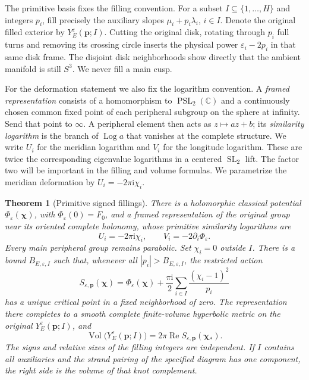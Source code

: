 \documentclass[11pt]{article}
\numberwithin{equation}{section}
\newtheorem{theorem}{Theorem}[section]
\theoremstyle{definition}\newtheorem{definition}[theorem]{Definition}
\theoremstyle{remark}\newtheorem{remark}[theorem]{Remark}
\newcommand{\ii}{\mathrm i}
\newcommand{\Vol}{\operatorname{Vol}}
\newcommand{\Rea}{\operatorname{Re}}
\newcommand{\Log}{\operatorname{Log}}
\newcommand{\eps}{\varepsilon}
\begin{document}
The primitive basis fixes the filling convention. For a subset
$I\subseteq\{1,\ldots,H\}$ and integers $p_i$, fill precisely the
auxiliary slopes $\mu_i+p_i\lambda_i$, $i\in I$. Denote the original
filled exterior by $Y_E^\eps(\mathbf p;I)$. Cutting the original disk,
rotating through $p_i$ full turns and removing its crossing circle
inserts the physical power $\eps_i-2p_i$ in that same disk frame.
The disjoint disk neighborhoods show directly that the ambient manifold
is still $S^3$. We never fill a main cusp.

For the deformation statement we also fix the logarithm convention.
A \emph{framed representation} consists of a homomorphism to
$\operatorname{PSL}_2(\mathbb C)$ and a continuously chosen common
fixed point of each peripheral subgroup on the sphere at infinity.
Send that point to $\infty$. A peripheral element then acts as
$z\mapsto a z+b$; its \emph{similarity logarithm} is the branch of
$\Log a$ that vanishes at the complete structure. We write $U_i$
for the meridian logarithm and $V_i$ for the longitude logarithm.
These are twice the corresponding eigenvalue logarithms in a centered
$\operatorname{SL}_2$ lift. The factor two will be important in the
filling and volume formulas. We parametrize the meridian deformation
by $U_i=-2\pi\ii\chi_i$.

\begin{theorem}[Primitive signed fillings]\label{sm:fillings}
There is a holomorphic classical potential $\Phi_\eps(\boldsymbol\chi)$,
with $\Phi_\eps(0)=F_0$, and a framed representation of the original
group near its oriented complete holonomy, whose primitive similarity
logarithms are
\begin{equation}\label{sm:UV}
       U_i=-2\pi\ii\chi_i,\qquad V_i=-2\partial_i\Phi_\eps.
\end{equation}
Every main peripheral group remains parabolic. Set $\chi_i=0$ outside
$I$. There is a bound $B_{E,\eps,I}$ such that, whenever all
$|p_i|>B_{E,\eps,I}$, the restricted action
\begin{equation}\label{sm:filled-action}
 S_{\eps,\mathbf p}(\boldsymbol\chi)=\Phi_\eps(\boldsymbol\chi)
       +\frac{\pi\ii}{2}\sum_{i\in I}\frac{(\chi_i-1)^2}{p_i}
\end{equation}
has a unique critical point in a fixed neighborhood of zero. The
representation there completes to a smooth complete finite-volume
hyperbolic metric on the original $Y_E^\eps(\mathbf p;I)$, and
\begin{equation}\label{sm:filled-volume}
 \Vol\bigl(Y_E^\eps(\mathbf p;I)\bigr)
                   =2\pi\Rea S_{\eps,\mathbf p}(\boldsymbol\chi_*).
\end{equation}
The signs and relative sizes of the filling integers are independent.
If $I$ contains all auxiliaries and the strand pairing of the specified diagram has one
component, the right side is the volume of that knot complement.
\end{theorem}
\end{document}
